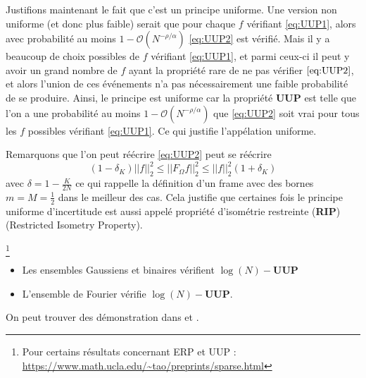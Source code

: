 \begin{remarque}
Justifions maintenant le fait que c'est un principe uniforme. 
	Une version non uniforme (et donc plus faible) serait que pour chaque $f$ vérifiant \ref{eq:UUP1}, alors avec probabilité au moins $1 -\mathcal{O}(N^{-\rho / \alpha})$  \ref{eq:UUP2} est vérifié. Mais il y a beaucoup de choix possibles de $f$ vérifiant \ref{eq:UUP1}, et parmi ceux-ci il peut y avoir un grand nombre de $f$ ayant la propriété rare de ne pas vérifier $\ref{eq:UUP2}$, et alors l'union de ces événements n'a pas nécessairement une faible probabilité de se produire.
	\newline
	Ainsi, le principe est uniforme car la propriété \textbf{UUP} est telle que l'on a une probabilité au moins $1- \mathcal{O}(N^{-\rho / \alpha})$ que \ref{eq:UUP2} soit vrai pour tous les $f$ possibles vérifiant \ref{eq:UUP1}. Ce qui justifie l'appélation uniforme.
\end{remarque}
\begin{remarque}
	Remarquons que l'on peut réécrire \ref{eq:UUP2} peut se réécrire
	\begin{equation*}
		(1-\delta_K)||f||_2^2 \leq ||F_\Omega f||_2^2 \leq ||f||_2^2(1 + \delta_K)
	\end{equation*}
	avec $\delta = 1 - \frac{K}{2N}$ ce qui rappelle la définition d'un frame avec des bornes $m = M = \frac{1}{2}$ dans le meilleur des cas.
	Cela justifie que certaines fois le principe uniforme d'incertitude est aussi appelé propriété d'isométrie restreinte (\textbf{RIP}) (Restricted Isometry Property).
\end{remarque}
\begin{proposition}\footnote{Pour certains résultats concernant ERP et UUP : \url{https://www.math.ucla.edu/~tao/preprints/sparse.html}}
	\newline 
	\begin{itemize}
		\item Les ensembles Gaussiens et binaires vérifient $\log(N)-\textbf{UUP}$
		\item L'ensemble de Fourier vérifie $\log(N)-\textbf{UUP}$.
	\end{itemize}
\end{proposition}
On peut trouver des démonstration dans \cite{CT} et \cite{foucartbook}.
